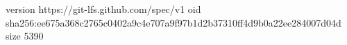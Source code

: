 version https://git-lfs.github.com/spec/v1
oid sha256:ee675a368c2765c0402a9c4e707a9f97b1d2b37310ff4d9b0a22ee284007d04d
size 5390
